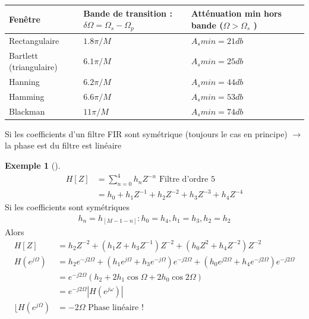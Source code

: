 \documentclass{article}
\theoremstyle{plain}%
\theoremstyle{definition}
\newtheorem{exmp}{Exemple}[section]
\theoremstyle{remark}
\begin{document}
\begin{table}[!ht]
    \centering
    \begin{tabular}{|l|l|l|}
    \hline
        Fenêtre & Bande de transition : $ \delta \Omega = \Omega _s - \Omega _p $   & Atténuation min hors bande ($ \Omega > \Omega _s $ )  \\ \hline
        Rectangulaire & $ 1.8 \pi/M$ & $ A_s min = 21db $ \\ \hline
        Bartlett (triangulaire) & $ 6.1 \pi/M$ & $ A_s min = 25db $ \\ \hline
        Hanning & $ 6.2\pi/M$ & $ A_s min = 44db $ \\ \hline
        Hamming & $ 6.6 \pi/M$ & $ A_s min = 53db $ \\ \hline
        Blackman & $ 11 \pi/M$ & $ A_s min = 74db $ \\ \hline
    \end{tabular}
\end{table}

Si les coefficients d'un filtre FIR sont symétrique (toujours le cas en principe) $\rightarrow$ la phase est du filtre est linéaire 
\begin{exmp}[]
    \begin{align*}
        H[Z] &= \sum_{n=0}^{4}h_n Z^{-n} \text{ Filtre d'ordre 5} \\
            &= h_0 + h_1 Z^{-1} + h_2 Z^{-2} + h_3 Z^{-3} + h_4 Z^{-4}
    \end{align*}
    Si les coefficients sont symétriques 
    \begin{align*}
        h_n = h_[M-1-n] :  h_0 = h_4, h_1 = h_3, h_2 = h_2
    \end{align*}
    Alors 
    \begin{align*}
        H[Z] &= h_2 Z^{-2} + (h_1 Z + h_3 Z^{-1}) Z^{-2} + (h_0 Z^2 + h_4 Z^{-2})Z^{-2} \\ 
        H(e^{j \Omega }) &= h_2 e^{-j 2\Omega } + (h_1e^{j \Omega } + h_3 e^{-j \Omega })e^{-j 2\Omega } + (h_0 e^{j 2\Omega } + h_4 e^{-j 2\Omega }) e^{-j 2\Omega } \\ 
            &= e^{-j 2\Omega }(h_2 + 2h_1 \cos \Omega + 2 h_0 \cos 2 \Omega ) \\ 
            &= e^{-j 2\Omega } \left| H(e^{j \omega }) \right| \\
        \lfloor H(e^{j \Omega }) &= -2 \Omega \text{ Phase linéaire !}
    \end{align*}
\end{exmp}
\end{document}
